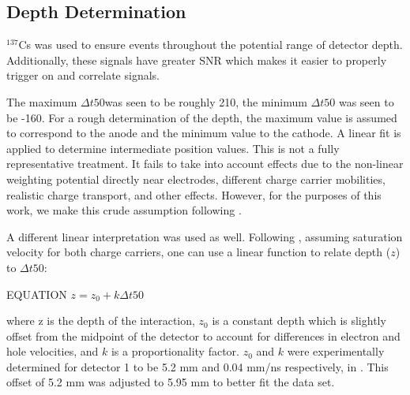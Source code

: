 \subsection{Depth Determination}

${}^{137}$Cs was used to ensure events throughout the potential range of detector depth. Additionally, these signals have greater SNR which makes it easier to properly trigger on and correlate signals.

The maximum $\Delta t50$was seen to be roughly 210, the minimum $\Delta t50$ was seen to be -160. For a rough determination of the depth, the maximum value is assumed to correspond to the anode and the minimum value to the cathode. A linear fit is applied to determine intermediate position values. This is not a fully representative treatment. It fails to take into account effects due to the non-linear weighting potential directly near electrodes, different charge carrier mobilities, realistic charge transport, and other effects. However, for the purposes of this work, we make this crude assumption following \cite{amman}.

A different linear interpretation was used as well. Following \cite{cci21}, assuming saturation velocity for both charge carriers, one can use a linear function to relate depth ($z$) to $\Delta t50$:

EQUATION
$z = z_0 + k \Delta t50$

where z is the depth of the interaction, $z_0$ is a constant depth which is slightly offset from the midpoint of the detector to account for differences in electron and hole velocities, and $k$ is a proportionality factor. $z_0$ and $k$ were experimentally determined for detector 1 to be 5.2 mm and 0.04 mm/ns respectively, in \cite{cci21}. This offset of 5.2 mm was adjusted to 5.95 mm to better fit the data set.

